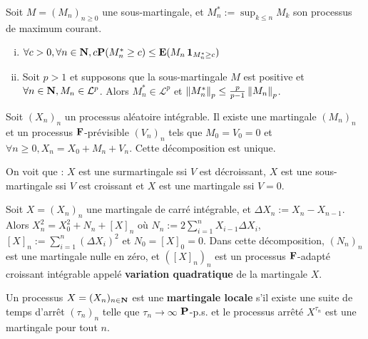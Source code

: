 	\begin{thm}
		Soit $M = (M_n)_{n \geq 0}$ une sous-martingale, et $M_n^* := \sup_{k \leq n} M_k$ son processus de maximum courant.
		\begin{enumerate}[(i)]
			\item $\forall c > 0, \forall n \in \mathbf{N}, c \mathbf{P}(M_n^* \geq c) \leq \mathbf{E}(M_n \operatorname{\mathbf{1}}_{M_n^* \geq c})$
			\item Soit $p > 1$ et supposons que la sous-martingale $M$ est positive et $\forall n \in \mathbf{N}, M_n \in \mathcal{L}^p$.
				Alors $M_n^* \in \mathcal{L}^p$ et $\left\lVert M_n^*\right\rVert_p \leq \frac{p}{p - 1} \left\lVert M_n\right\rVert_p$.
		\end{enumerate}
	\end{thm}

	\begin{pop}
		Soit $(X_n)_n$ un processus aléatoire intégrable.
		Il existe une martingale $(M_n)_n$ et un processus $\mathbf{F}$-prévisible $(V_n)_n$ tels que $M_0 = V_0 = 0$ et $\forall n \geq 0, X_n = X_0 + M_n + V_n$.
		Cette décomposition est unique.
	\end{pop}

	\begin{rem}
		On voit que : $X$ est une surmartingale ssi $V$ est décroissant, $X$ est une sous-martingale ssi $V$ est croissant et $X$ est une martingale ssi $V = 0$.
	\end{rem}

	\begin{pop}
		Soit $X = (X_n)_n$ une martingale de carré intégrable, et $\Delta X_n := X_n - X_{n - 1}$.
		Alors $X_n^2 = X_0^2 + N_n + [X]_n$ où $N_n := 2 \sum_{i = 1}^n  X_{i - 1} \Delta X_i$, $[X]_n := \sum_{i = 1}^n (\Delta X_i)^2$ et $N_0 = [X]_0 = 0$.
		Dans cette décomposition, $(N_n)_n$ est une martingale nulle en zéro, et $([X]_n)_n$ est un processus $\mathbf{F}$-adapté croissant intégrable appelé \textbf{variation quadratique} de la martingale $X$.
	\end{pop}

	\begin{defn}
		Un processus $X = (X_n)_{n \in \mathbf{N}}$ est une \textbf{martingale locale} s'il existe une suite de temps d'arrêt $(\tau_n)_n$ telle que $\tau_n \longrightarrow \infty$ $\mathbf{P}$-p.s. et le processus arrêté $X^{\tau_n}$ est une martingale pour tout $n$.
	\end{defn}
